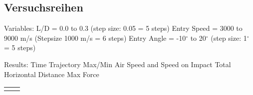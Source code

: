 \subsection{Versuchsreihen}
Variables:
L/D = 0.0 to 0.3 (step size: 0.05 = 5 steps)
Entry Speed = 3000 to 9000 m/s  (Stepsize 1000 m/s = 6 steps)
Entry Angle = -10$^{\circ}$ to 20$^{\circ}$ (step size: 1$^{\circ}$ = 5 steps) 

Results:
Time
Trajectory
Max/Min Air Speed and Speed on Impact
Total Horizontal Distance
Max Force

\begin{tabular}{|c|c|}
	\hline 
	&  \\ 
	\hline 
	&  \\ 
	\hline 
\end{tabular} 